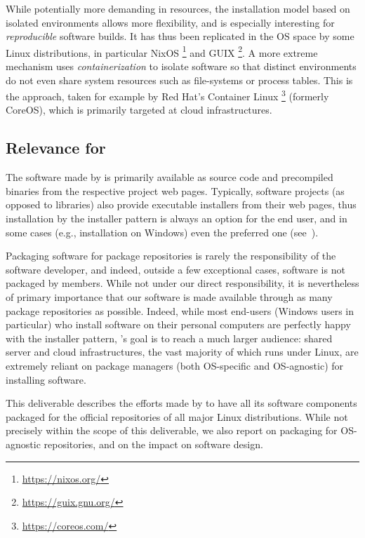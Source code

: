 \documentclass{deliverablereport}
\begin{document}
While potentially more demanding in resources, the installation model
based on isolated environments allows more flexibility, and is
especially interesting for \emph{reproducible} software builds. %
It has thus been replicated in the OS space by some Linux
distributions, in particular NixOS%
\footnote{\url{https://nixos.org/}} %
and GUIX%
\footnote{\url{https://guix.gnu.org/}}. %
A more extreme mechanism uses \emph{containerization} to isolate
software so that distinct environments do not even share system
resources such as file-systems or process tables. %
This is the approach, taken for example by Red Hat's Container Linux%
\footnote{\url{https://coreos.com/}} %
(formerly CoreOS), which is primarily targeted at cloud infrastructures.

\subsection{Relevance for \ODK}

The software made by \ODK is primarily available as source code and
precompiled binaries from the respective project web pages. %
Typically, software projects (as opposed to libraries) also provide
executable installers from their web pages, thus installation by the
installer pattern is always an option for the end user, and in some
cases (e.g., installation on Windows) even the preferred one
(see~).

Packaging software for package repositories is rarely the
responsibility of the software developer, and indeed, outside a few
exceptional cases, \ODK software is not packaged by \ODK members. %
While not under our direct responsibility, it is nevertheless of
primary importance that our software is made available through as many
package repositories as possible. %
Indeed, while most end-users (Windows users in particular) who install
software on their personal computers are perfectly happy with the
installer pattern, \ODK's goal is to reach a much larger audience:
shared server and cloud infrastructures, the vast majority of which
runs under Linux, are extremely reliant on package managers
(both OS-specific and OS-agnostic) for installing software.

This deliverable describes the efforts made by \ODK to have all its
software components packaged for the official repositories of all
major Linux distributions. %
While not precisely within the scope of this deliverable, we also
report on packaging for OS-agnostic repositories, and on the impact on
software design.
\end{document}
